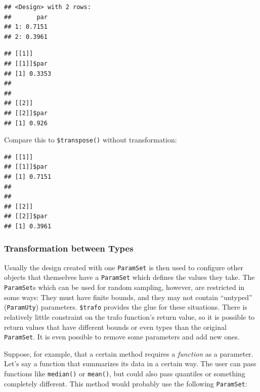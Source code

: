 \documentclass[]{scrbook}
\newenvironment{Shaded}{\begin{snugshade}}{\end{snugshade}}
\newcommand{\CommentTok}[1]{\textcolor[rgb]{0.56,0.35,0.01}{\textit{#1}}}
\newcommand{\DataTypeTok}[1]{\textcolor[rgb]{0.13,0.29,0.53}{#1}}
\newcommand{\KeywordTok}[1]{\textcolor[rgb]{0.13,0.29,0.53}{\textbf{#1}}}
\newcommand{\NormalTok}[1]{#1}
\newcommand{\OperatorTok}[1]{\textcolor[rgb]{0.81,0.36,0.00}{\textbf{#1}}}
\newcommand{\OtherTok}[1]{\textcolor[rgb]{0.56,0.35,0.01}{#1}}
\renewenvironment{Shaded} {\begin{snugshade}\small} {\end{snugshade}}
\begin{document}
\begin{verbatim}
## <Design> with 2 rows:
##       par
## 1: 0.7151
## 2: 0.3961
\end{verbatim}

\begin{Shaded}
\end{Shaded}

\begin{verbatim}
## [[1]]
## [[1]]$par
## [1] 0.3353
## 
## 
## [[2]]
## [[2]]$par
## [1] 0.926
\end{verbatim}

Compare this to \texttt{\$transpose()} without transformation:

\begin{Shaded}
\end{Shaded}

\begin{verbatim}
## [[1]]
## [[1]]$par
## [1] 0.7151
## 
## 
## [[2]]
## [[2]]$par
## [1] 0.3961
\end{verbatim}

\hypertarget{transformation-between-types}{%
\subsubsection{Transformation between Types}\label{transformation-between-types}}

Usually the design created with one \texttt{ParamSet} is then used to configure other objects that themselves have a \texttt{ParamSet} which defines the values they take.
The \texttt{ParamSet}s which can be used for random sampling, however, are restricted in some ways:
They must have finite bounds, and they may not contain ``untyped'' (\texttt{ParamUty}) parameters.
\texttt{\$trafo} provides the glue for these situations.
There is relatively little constraint on the trafo function's return value, so it is possible to return values that have different bounds or even types than the original \texttt{ParamSet}.
It is even possible to remove some parameters and add new ones.

Suppose, for example, that a certain method requires a \emph{function} as a parameter.
Let's say a function that summarizes its data in a certain way.
The user can pass functions like \texttt{median()} or \texttt{mean()}, but could also pass quantiles or something completely different.
This method would probably use the following \texttt{ParamSet}:
\end{document}
